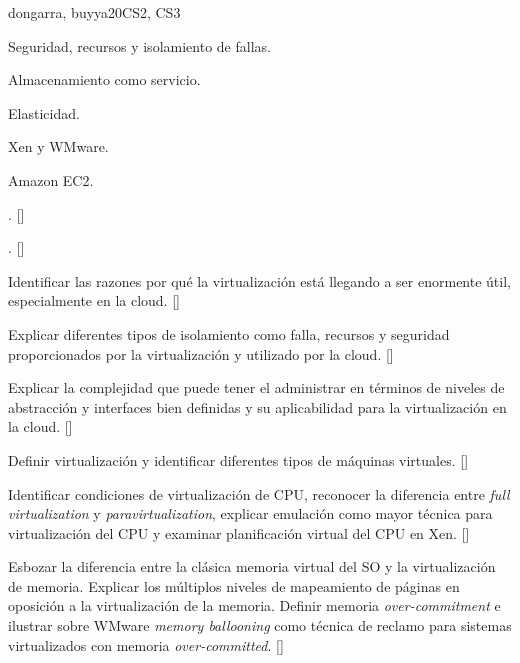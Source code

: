 \begin{syllabus}
\begin{unit}{\PDCloudComputing}{}{dongarra, buyya}{20}{CS2, CS3}
\begin{topics}
    \item \PDCloudComputingTopicVirtualization
    \item Seguridad, recursos y isolamiento de fallas.
    \item Almacenamiento como servicio.
    \item Elasticidad.
    \item Xen y WMware.
    \item Amazon EC2.
\end{topics}
\begin{learningoutcomes}
    \item \PDCloudComputingTopicVirtualization. [\Familiarity]
    \item \PDCloudComputingLOExplainTheDisadvantages. [\Familiarity]
    \item Identificar las razones por qué la virtualización está llegando a ser enormente útil, especialmente en la cloud. [\Familiarity]
    \item Explicar diferentes tipos de isolamiento como falla, recursos y seguridad proporcionados por la virtualización y utilizado por la cloud. [\Familiarity]
    \item Explicar la complejidad que puede tener el administrar en términos de niveles de abstracción y interfaces bien definidas y su aplicabilidad para la virtualización en la cloud.  [\Familiarity]
    \item Definir virtualización y identificar diferentes tipos de máquinas virtuales. [\Familiarity]
    \item Identificar condiciones de virtualización de CPU, reconocer la diferencia entre {\em full virtualization} y {\em paravirtualization}, explicar emulación como mayor técnica para virtualización del CPU y examinar planificación virtual del CPU en Xen. [\Familiarity]
    \item Esbozar la diferencia entre la clásica memoria virtual del SO y la virtualización de memoria. Explicar los múltiplos niveles de mapeamiento de páginas en oposición a la virtualización de la memoria. Definir memoria {\em over-commitment} e ilustrar sobre WMware {\em memory ballooning} como técnica de reclamo para sistemas virtualizados con memoria {\em over-committed}. [\Familiarity]
\end{learningoutcomes}
\end{unit}


\end{syllabus}

